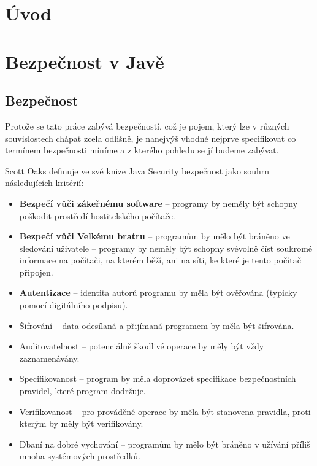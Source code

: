 
\chapter{Úvod} \label{uplnyUvod}



\chapter{Bezpečnost v Javě} \label{teoretickyUvod}

\section{Bezpečnost}

Protože se tato práce zabývá bezpečností, což je pojem, který lze v různých souvislostech chápat zcela odlišně, je nanejvýš vhodné nejprve specifikovat co termínem bezpečnosti míníme a z kterého pohledu se jí budeme zabývat.

Scott Oaks definuje ve své knize Java Security bezpečnost jako souhrn následujících kritérií: \cite[1.1]{oaks}

\begin{itemize}
  \item {\bf Bezpečí vůči zákeřnému software} -- programy by neměly být schopny poškodit prostředí hostitelského počítače.
  \item {\bf Bezpečí vůči Velkému bratru} -- programům by mělo být bráněno ve sledování uživatele -- programy by neměly být schopny svévolně číst soukromé informace na počítači, na kterém běží, ani na síti, ke které je tento počítač připojen.
  \item {\bf Autentizace} -- identita autorů programu by měla být ověřována (typicky pomocí digitálního podpisu).
  \item Šifrování -- data odesílaná a přijímaná programem by měla být šifrována.
  \item Auditovatelnost -- potenciálně škodlivé operace by měly být vždy zaznamenávány.
  \item Specifikovanost -- program by měla doprovázet specifikace bezpečnostních pravidel, které program dodržuje.
  \item Verifikovanost -- pro prováděné operace by měla být stanovena pravidla, proti kterým by měly být verifikovány.
  \item Dbaní na dobré vychování -- programům by mělo být bráněno v užívání příliš mnoha systémových prostředků.
\end{itemize}


